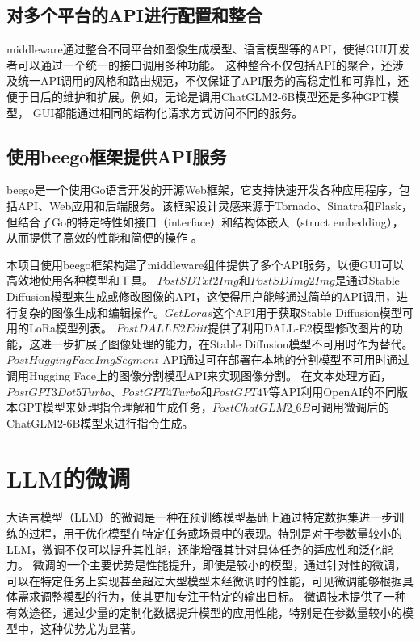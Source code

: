 \documentclass[a4paper,AutoFakeBold,oneside,12pt]{book}
\begin{document}
\section{对多个平台的API进行配置和整合}
middleware通过整合不同平台如图像生成模型、语言模型等的API，使得GUI开发者可以通过一个统一的接口调用多种功能。
这种整合不仅包括API的聚合，还涉及统一API调用的风格和路由规范，不仅保证了API服务的高稳定性和可靠性，还便于日后的维护和扩展。例如，无论是调用ChatGLM2-6B模型还是多种GPT模型，
GUI都能通过相同的结构化请求方式访问不同的服务。


\section{使用beego框架提供API服务}
beego是一个使用Go语言开发的开源Web框架，它支持快速开发各种应用程序，包括API、Web应用和后端服务。该框架设计灵感来源于Tornado、Sinatra和Flask，但结合了Go的特定特性如接口（interface）和结构体嵌入（struct embedding），从而提供了高效的性能和简便的操作​ 。

本项目使用beego框架构建了middleware组件提供了多个API服务，以便GUI可以高效地使用各种模型和工具。
$PostSDTxt2Img$和$PostSDImg2Img$是通过Stable Diffusion模型来生成或修改图像的API，这使得用户能够通过简单的API调用，进行复杂的图像生成和编辑操作。$GetLoras$这个API用于获取Stable Diffusion模型可用的LoRa模型列表。
$PostDALLE2Edit$提供了利用DALL-E2模型修改图片的功能，这进一步扩展了图像处理的能力，在Stable Diffusion模型不可用时作为替代。
$PostHuggingFaceImgSegment$ API通过可在部署在本地的分割模型不可用时通过调用Hugging Face上的图像分割模型API来实现图像分割。
在文本处理方面，$PostGPT3Dot5Turbo$、$PostGPT4Turbo$和$PostGPT4V$等API利用OpenAI的不同版本GPT模型来处理指令理解和生成任务，$PostChatGLM2\_6B$可调用微调后的ChatGLM2-6B模型来进行指令生成。

\chapter{LLM的微调} %
大语言模型（LLM）的微调是一种在预训练模型基础上通过特定数据集进一步训练的过程，用于优化模型在特定任务或场景中的表现。特别是对于参数量较小的LLM，微调不仅可以提升其性能，还能增强其针对具体任务的适应性和泛化能力。
微调的一个主要优势是性能提升，即使是较小的模型，通过针对性的微调，可以在特定任务上实现甚至超过大型模型未经微调时的性能，可见微调能够根据具体需求调整模型的行为，使其更加专注于特定的输出目标。
微调技术提供了一种有效途径，通过少量的定制化数据提升模型的应用性能，特别是在参数量较小的模型中，这种优势尤为显著。
\end{document}
